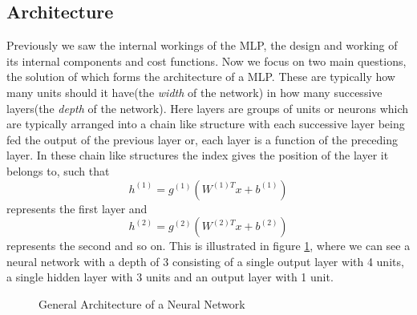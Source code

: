 \documentclass[12pt]{extarticle}
\numberwithin{equation}{section}
\begin{document}
	\subsection{Architecture}
	Previously we saw the internal workings of the MLP, the design and working of its internal components and cost functions. Now we focus on two main questions, the solution of which forms the architecture of a MLP. These are typically how many units should it have(the \textit{width} of the network) in how many successive layers(the \textit{depth} of the network). Here layers are groups of units or neurons which are typically arranged into a chain like structure with each successive layer being fed the output of the previous layer or, each layer is a function of the preceding layer. In these chain like structures the index gives the position of the layer it belongs to, such that $$h^{(1)} = g^{(1)}(W^{(1)T}x + b^{(1)})$$ represents the first layer and $$h^{(2)} = g^{(2)}(W^{(2)T}x + b^{(2)})$$ represents the second\cite{Goodfellow-et-al-2016} and so on. This is illustrated in figure \ref{nn_arch}, where we can see a neural network with a depth of 3 consisting of a single output layer with 4 units, a single hidden layer with 3 units and an output layer with 1 unit.
	\begin{figure}[H]
		\centering
		\setlength{\fboxsep}{5pt}%
		\setlength{\fboxrule}{1pt}%
		\caption{General Architecture of a Neural Network
			\label{nn_arch}}
	\end{figure}
\end{document}
